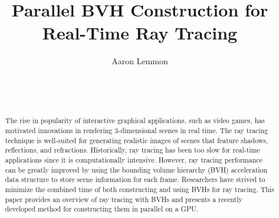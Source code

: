 \documentclass{sig-alternate}
\begin{document}

\title{Parallel BVH Construction for Real-Time Ray Tracing}


\author{
\alignauthor
Aaron Lemmon\\
	\\
	\\
	\\
}

\maketitle
\begin{abstract}

The rise in popularity of interactive graphical applications, such as video games, has motivated innovations in rendering 3-dimensional scenes in real time. The ray tracing technique is well-suited for generating realistic images of scenes that feature shadows, reflections, and refractions. Historically, ray tracing has been too slow for real-time applications since it is computationally intensive. However, ray tracing performance can be greatly improved by using the bounding volume hierarchy (BVH) acceleration data structure to store scene information for each frame. Researchers have strived to minimize the combined time of both constructing and using BVHs for ray tracing. This paper provides an overview of ray tracing with BVHs and presents a recently developed method for constructing them in parallel on a GPU.
	
\end{abstract}

\end{document}

